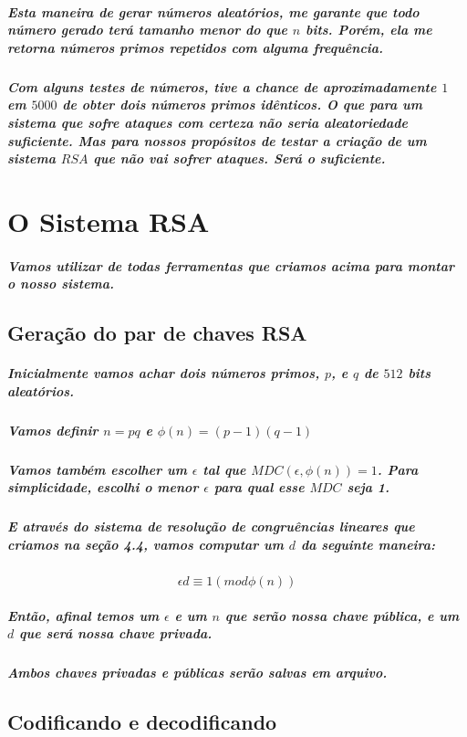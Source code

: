 \documentclass[12pt,twoside, a4paper, twocolumn]{article}
\begin{document}
\subparagraph*{Esta maneira de gerar números aleatórios, me garante que todo número gerado terá tamanho menor do que $n$ bits. Porém, ela me retorna números primos repetidos com alguma frequência.}

\subparagraph*{Com alguns testes de números, tive a chance de aproximadamente $1$ em $5000$ de obter dois números primos idênticos. O que para um sistema que sofre ataques com certeza não seria aleatoriedade suficiente. Mas para nossos propósitos de testar a criação de um sistema $RSA$ que não vai sofrer ataques. Será o suficiente.}



\section{O Sistema RSA}

\subparagraph*{Vamos utilizar de todas ferramentas que criamos acima para montar o nosso sistema.}



\subsection{Geração do par de chaves RSA}

\subparagraph*{Inicialmente vamos achar dois números primos, $p$, e $q$ de $512$ bits aleatórios.}

\subparagraph*{Vamos definir $n = pq$ e $\phi(n) = (p-1)(q-1)$}

\subparagraph*{Vamos também escolher um $\epsilon$ tal que $MDC(\epsilon, \phi(n)) = 1$. Para simplicidade, escolhi o menor $\epsilon$ para qual esse $MDC$ seja 1.}

\subparagraph*{E através do sistema de resolução de congruências lineares que criamos na seção 4.4, vamos computar um $d$ da seguinte maneira:}

\begin{equation}
    \epsilon d \equiv 1 (mod \phi(n))
\end{equation}

\subparagraph*{Então, afinal temos um $\epsilon$ e um $n$ que serão nossa chave pública, e um $d$ que será nossa chave privada.}

\subparagraph*{Ambos chaves privadas e públicas serão salvas em arquivo.}

\subsection{Codificando e decodificando}
\end{document}
